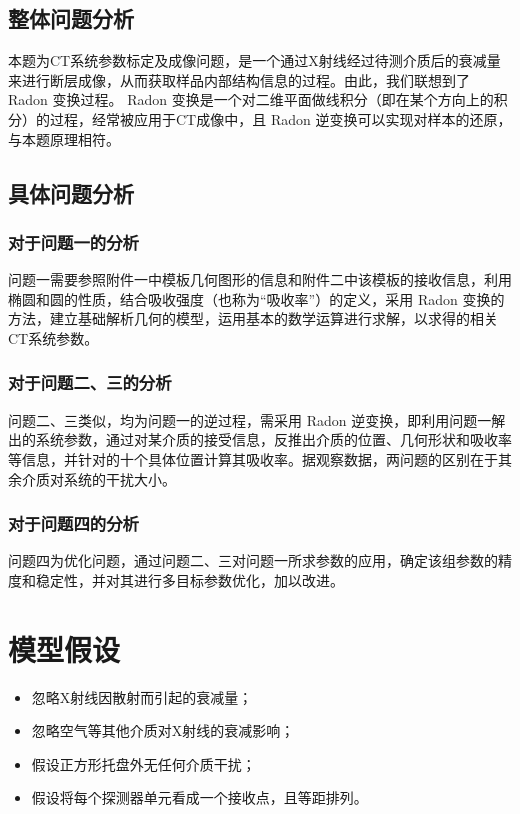 \documentclass[UTF8]{ctexart}
\begin{document}
\subsection{整体问题分析}

本题为CT系统参数标定及成像问题，是一个通过X射线经过待测介质后的衰减量来进行断层成像，从而获取样品内部结构信息的过程。由此，我们联想到了 Radon 变换过程。 Radon 变换是一个对二维平面做线积分（即在某个方向上的积分）的过程，经常被应用于CT成像中，且 Radon 逆变换可以实现对样本的还原，与本题原理相符。

\subsection{具体问题分析}
\subsubsection{对于问题一的分析}

问题一需要参照附件一中模板几何图形的信息和附件二中该模板的接收信息，利用椭圆和圆的性质，结合吸收强度（也称为“吸收率”）的定义，采用 Radon 变换的方法，建立基础解析几何的模型，运用基本的数学运算进行求解，以求得的相关CT系统参数。

\subsubsection{对于问题二、三的分析}

问题二、三类似，均为问题一的逆过程，需采用 Radon 逆变换，即利用问题一解出的系统参数，通过对某介质的接受信息，反推出介质的位置、几何形状和吸收率等信息，并针对的十个具体位置计算其吸收率。据观察数据，两问题的区别在于其余介质对系统的干扰大小。

\subsubsection{对于问题四的分析}

问题四为优化问题，通过问题二、三对问题一所求参数的应用，确定该组参数的精度和稳定性，并对其进行多目标参数优化，加以改进。



\section{模型假设}
\begin{itemize} 
\item  忽略X射线因散射而引起的衰减量；
\item  忽略空气等其他介质对X射线的衰减影响；
\item  假设正方形托盘外无任何介质干扰；
\item  假设将每个探测器单元看成一个接收点，且等距排列。
\end{itemize} 
\end{document}
